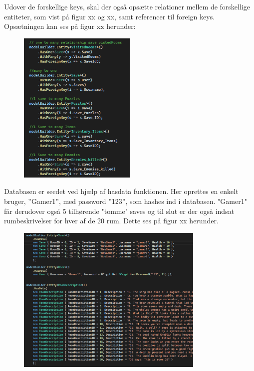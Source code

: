 Udover de forskellige keys, skal der også opsætte relationer mellem de forskellige entiteter, som vist på figur xx og xx, samt referencer til foreign keys. 
Opsætningen kan ses på figur xx herunder: 

\begin{figure}[H]
\centering
\includegraphics[width = 0.5\textwidth]{02-Body/Images/DAL-Database/DbRelations.PNG}
\caption{}
\label{fig:DbRelations}
\end{figure}

Databasen er seedet ved hjælp af hasdata funktionen. Her oprettes en enkelt bruger, ”Gamer1”, med password ”123”, som hashes ind i databasen. "Gamer1" får derudover også 5 tilhørende "tomme" saves og til slut er der også indsat rumbeskrivelser for hver af de 20 rum. Dette ses på figur xx herunder. \\

\begin{figure}[H]
\centering
\includegraphics[width = 0.8\textwidth]{02-Body/Images/DAL-Database/DbSeeding.PNG}
\caption{}
\label{fig:DbSeeding}
\end{figure}